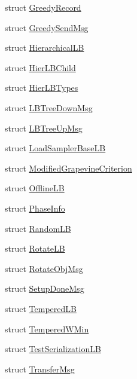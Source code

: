 \begin{DoxyCompactItemize}
struct \hyperlink{structvt_1_1vrt_1_1collection_1_1lb_1_1_greedy_record}{Greedy\+Record}
\item 
struct \hyperlink{structvt_1_1vrt_1_1collection_1_1lb_1_1_greedy_send_msg}{Greedy\+Send\+Msg}
\item 
struct \hyperlink{structvt_1_1vrt_1_1collection_1_1lb_1_1_hierarchical_l_b}{Hierarchical\+LB}
\item 
struct \hyperlink{structvt_1_1vrt_1_1collection_1_1lb_1_1_hier_l_b_child}{Hier\+L\+B\+Child}
\item 
struct \hyperlink{structvt_1_1vrt_1_1collection_1_1lb_1_1_hier_l_b_types}{Hier\+L\+B\+Types}
\item 
struct \hyperlink{structvt_1_1vrt_1_1collection_1_1lb_1_1_l_b_tree_down_msg}{L\+B\+Tree\+Down\+Msg}
\item 
struct \hyperlink{structvt_1_1vrt_1_1collection_1_1lb_1_1_l_b_tree_up_msg}{L\+B\+Tree\+Up\+Msg}
\item 
struct \hyperlink{structvt_1_1vrt_1_1collection_1_1lb_1_1_load_sampler_base_l_b}{Load\+Sampler\+Base\+LB}
\item 
struct \hyperlink{structvt_1_1vrt_1_1collection_1_1lb_1_1_modified_grapevine_criterion}{Modified\+Grapevine\+Criterion}
\item 
struct \hyperlink{structvt_1_1vrt_1_1collection_1_1lb_1_1_offline_l_b}{Offline\+LB}
\item 
struct \hyperlink{structvt_1_1vrt_1_1collection_1_1lb_1_1_phase_info}{Phase\+Info}
\item 
struct \hyperlink{structvt_1_1vrt_1_1collection_1_1lb_1_1_random_l_b}{Random\+LB}
\item 
struct \hyperlink{structvt_1_1vrt_1_1collection_1_1lb_1_1_rotate_l_b}{Rotate\+LB}
\item 
struct \hyperlink{structvt_1_1vrt_1_1collection_1_1lb_1_1_rotate_obj_msg}{Rotate\+Obj\+Msg}
\item 
struct \hyperlink{structvt_1_1vrt_1_1collection_1_1lb_1_1_setup_done_msg}{Setup\+Done\+Msg}
\item 
struct \hyperlink{structvt_1_1vrt_1_1collection_1_1lb_1_1_tempered_l_b}{Tempered\+LB}
\item 
struct \hyperlink{structvt_1_1vrt_1_1collection_1_1lb_1_1_tempered_w_min}{Tempered\+W\+Min}
\item 
struct \hyperlink{structvt_1_1vrt_1_1collection_1_1lb_1_1_test_serialization_l_b}{Test\+Serialization\+LB}
\item 
struct \hyperlink{structvt_1_1vrt_1_1collection_1_1lb_1_1_transfer_msg}{Transfer\+Msg}
\end{DoxyCompactItemize}
